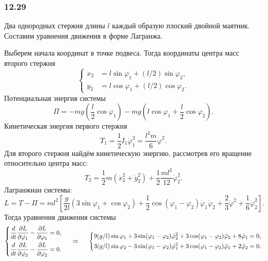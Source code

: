 \subsubsection*{12.29}

Два однородных стержня длины $l$ каждый образую плоский двойной маятник. Составим уравнения движения в форме Лагранжа. 

Выберем начала координат в точке подвеса. Тогда координаты центра масс второго стержня
\begin{equation*}
    \left\{\begin{aligned}
        x_2 &= l \sin \varphi_1 + (l/2) \sin \varphi_2, \\
        y_2 &= l \cos \varphi_1 + (l/2) \cos \varphi_2.
    \end{aligned}\right.
\end{equation*}
Потенциальная энергия системы
\begin{equation*}
    \Pi = -mg \left(\frac{l}{2} \cos \varphi_1 \right) -
    mg \left(
        l \cos \varphi_1 + \frac{l}{2} \cos \varphi_2
    \right).
\end{equation*}
Кинетическая энергия первого стержня
\begin{equation*}
    T_1 = \frac{1}{2} I_1 \dot{\varphi}_1^2 = \frac{l^2 m}{6}  \dot{\varphi}^2.
\end{equation*}
Для второго стержня найдём кинетическую энергию, рассмотрев его вращение относительно центра масс:
\begin{equation*}
    T_2 = \frac{1}{2} m \left( \dot{x}_2^2 + \dot{y}_2^2\right) +
    \frac{1}{2} \frac{m l^2}{12}  \dot{\varphi}_2^2.
\end{equation*}
Лагранжиан системы:
\begin{equation}
    L = T - \Pi 
    =  ml^2 \left[
        \frac{g}{2l} \left( 3 \sin \varphi_1 +  \cos \varphi_2  \right)
        + \frac{1}{2} \cos (\varphi_1 - \varphi_2) \dot{\varphi}_1 \dot{\varphi}_2 + \frac{2}{3}  \dot{\varphi}^2 + \frac{1}{6} \dot{\varphi}_2^2
        \right].
\end{equation}
Тогда уравнения движения системы
\begin{equation}
    \left\{\begin{aligned}
        \frac{d }{d t} \frac{\partial L}{\partial \dot{\varphi_1}} - \frac{\partial L}{\partial \varphi_1} &= 0, \\
        \frac{d }{d t} \frac{\partial L}{\partial \dot{\varphi_2}} - \frac{\partial L}{\partial \varphi_2} &= 0.
    \end{aligned}\right.
    \hspace{0.5cm} \Rightarrow \hspace{0.5cm} 
    \left\{\begin{aligned}
    9 (g/l) \sin \varphi_1 + 3  \sin (\varphi_1 - \varphi_2) \dot{\varphi}^2_2
    + 3 \cos (\varphi_1 - \varphi_2) \ddot{\varphi}_2 + 8  \ddot{\varphi}_1 &= 0, \\
    3 (g/l) \sin \varphi_2 - 3  \sin (\varphi_1 - \varphi_2) \dot{\varphi}_1^2
    + 3 \cos (\varphi_1 - \varphi_2) \ddot{\varphi}_1 + 2  \ddot{\varphi}_2 &= 0.
    \end{aligned}\right.
\end{equation}
